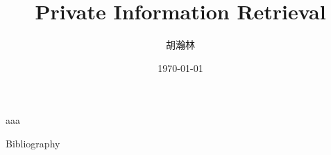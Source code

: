 \documentclass{beamer}
\title{\bfseries Private Information Retrieval}
\author{胡瀚林}
\date{\today}
\begin{document}
\maketitle

\begin{frame}
aaa \cite{heurix_taxonomy_2015}
\end{frame}
\begin{frame}[t,allowframebreaks]{Bibliography}


\end{frame}
\end{document}
